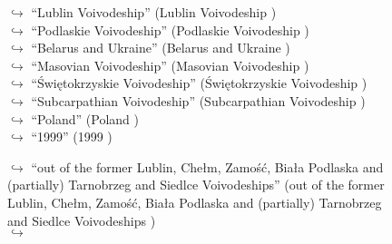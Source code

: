 \documentclass[11pt,a4paper, onecolumn]{article}
\begin{document}
\begin{figure}[t] \small \begin{tcolorbox}[boxsep=0pt,left=5pt,right=0pt,top=2pt,colback = yellow!5] \begin{dialogue}
 \small 
\colorbox{pink!25}{$\hookrightarrow$}
{ ``Lublin Voivodeship'' (Lublin Voivodeship ) }
\\
\colorbox{pink!25}{$\hookrightarrow$}
{ ``Podlaskie Voivodeship'' (Podlaskie Voivodeship ) }
\\
\colorbox{pink!25}{$\hookrightarrow$}
{ ``Belarus and Ukraine'' (Belarus and Ukraine ) }
\\
\colorbox{pink!25}{$\hookrightarrow$}
{ ``Masovian Voivodeship'' (Masovian Voivodeship ) }
\\
\colorbox{pink!25}{$\hookrightarrow$}
{ ``Świętokrzyskie Voivodeship'' (Świętokrzyskie Voivodeship ) }
\\
\colorbox{pink!25}{$\hookrightarrow$}
{ ``Subcarpathian Voivodeship'' (Subcarpathian Voivodeship ) }
\\
\colorbox{pink!25}{$\hookrightarrow$}
{ ``Poland'' (Poland ) }
\\
\colorbox{pink!25}{$\hookrightarrow$}
{ ``1999'' (1999 ) }
 \end{dialogue}\end{tcolorbox}\end{figure}\begin{figure}[t] \small \begin{tcolorbox}[boxsep=0pt,left=5pt,right=0pt,top=2pt,colback = yellow!5] \begin{dialogue}
 \small 
\colorbox{pink!25}{$\hookrightarrow$}
{ ``out of the former Lublin, Chełm, Zamość, Biała Podlaska and (partially) Tarnobrzeg and Siedlce Voivodeships'' (out of the former Lublin, Chełm, Zamość, Biała Podlaska and (partially) Tarnobrzeg and Siedlce Voivodeships ) }
\\
\colorbox{pink!25}{$\hookrightarrow$}

\end{dialogue}
\end{tcolorbox}
\end{figure}
\end{document}
